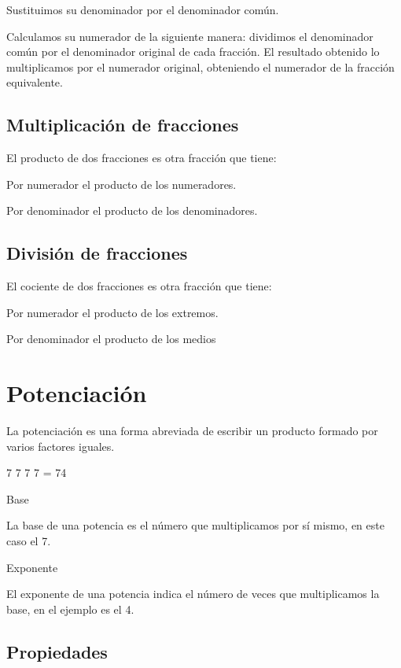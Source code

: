 \documentclass{article}
\begin{document}
Sustituimos su denominador por el denominador com\'un.

Calculamos su numerador de la siguiente manera: dividimos el denominador com\'un por el denominador original de cada fracci\'on. El resultado obtenido lo multiplicamos por el numerador original, obteniendo el numerador de la fracci\'on equivalente.

\subsection[Multiplicaci\'on de fracciones]{Multiplicaci\'on de fracciones}

\bigskip

El producto de dos fracciones es otra fracci\'on que tiene:

Por numerador el producto de los numeradores.

Por denominador el producto de los denominadores.

\subsection[Divisi\'on de fracciones]{Divisi\'on de fracciones}

\bigskip

El cociente de dos fracciones es otra fracci\'on que tiene:

Por numerador el producto de los extremos.

Por denominador el producto de los medios


\bigskip

\section[Potenciaci\'on]{Potenciaci\'on}
La potenciaci\'on es una forma abreviada de escribir un producto formado por varios factores iguales.

7 {\textbullet} 7 {\textbullet} 7 {\textbullet} 7 = 74

Base

La base de una potencia es el n\'umero que multiplicamos por s\'i mismo, en este caso el 7.

Exponente

El exponente de una potencia indica el n\'umero de veces que multiplicamos la base, en el ejemplo es el 4.


\bigskip

\subsection[Propiedades]{Propiedades}
\end{document}
